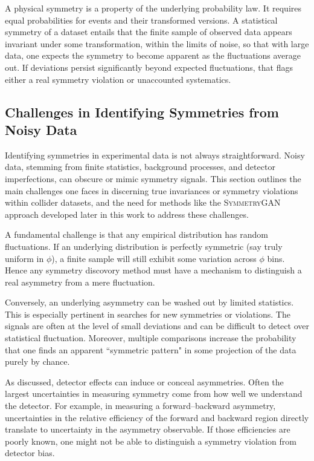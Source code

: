             A physical symmetry is a property of the underlying probability law.
            It requires equal probabilities for events and their transformed versions.
            A statistical symmetry of a dataset entails that the finite sample of observed data appears invariant under some transformation, within the limits of noise, so that with large data, one expects the symmetry to become apparent as the fluctuations average out.
            If deviations persist significantly beyond expected fluctuations, that flags either a real symmetry violation or unaccounted systematics.
            

    \subsection{Challenges in Identifying Symmetries from Noisy Data}
    \label{subsec:noisy-symmetries}
        Identifying symmetries in experimental data is not always straightforward.
        Noisy data, stemming from finite statistics, background processes, and detector imperfections, can obscure or mimic symmetry signals.
        This section outlines the main challenges one faces in discerning true invariances or symmetry violations within collider datasets, and the need for methods like the \textsc{SymmetryGAN} approach developed later in this work to address these challenges.

        A fundamental challenge is that any empirical distribution has random fluctuations.
        If an underlying distribution is perfectly symmetric (say truly uniform in $\phi$), a finite sample will still exhibit some variation across $\phi$ bins.
        Hence any symmetry discovory method must have a mechanism to distinguish a real asymmetry from a mere fluctuation.
        
        Conversely, an underlying asymmetry can be washed out by limited statistics.
        This is especially pertinent in searches for new symmetries or violations.
        The signals are often at the level of small deviations and can be difficult to detect over statistical fluctuation.
        Moreover, multiple comparisons increase the probability that one finds an apparent ``symmetric pattern" in some projection of the data purely by chance.

        As discussed, detector effects can induce or conceal asymmetries.
        Often the largest uncertainties in measuring symmetry come from how well we understand the detector.
        For example, in measuring a forward--backward asymmetry, uncertainties in the relative efficiency of the forward and backward region directly translate to uncertainty in the asymmetry observable.
        If those efficiencies are poorly known, one might not be able to distinguish a symmetry violation from detector bias.
        
